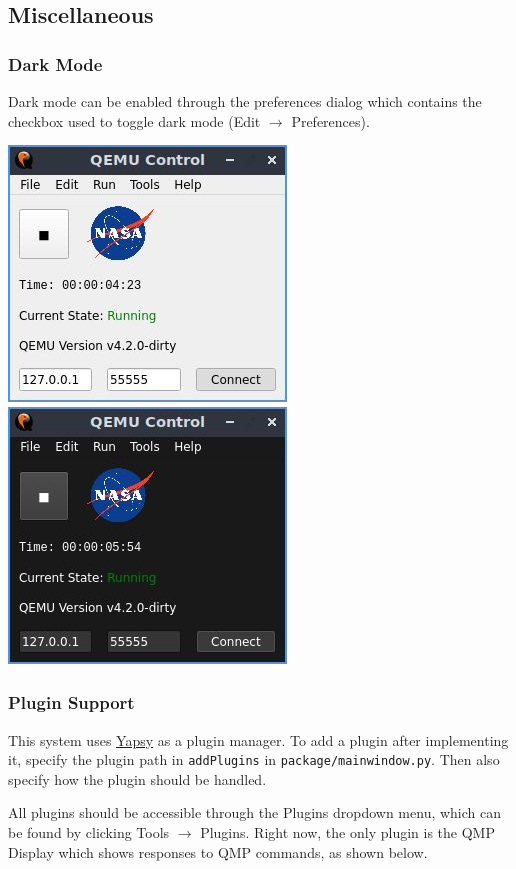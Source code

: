 \documentclass{article}
\newcommand{\code}[1]{\texttt{#1}}
\begin{document}
\subsection{Miscellaneous}
\subsubsection{Dark Mode}
Dark mode can be enabled through the preferences dialog which contains the checkbox used to toggle dark mode (Edit $\rightarrow$ Preferences).
\begin{center}
    \includegraphics[]{images/main_active.jpg}
    \includegraphics[]{images/main_active_dark.jpg}
\end{center}
\subsubsection{Plugin Support}
This system uses \href{https://yapsy.readthedocs.io/en/latest/}{Yapsy} as a plugin manager. To add a plugin after implementing it, specify the plugin path in \code{addPlugins} in \code{package/mainwindow.py}. Then also specify how the plugin should be handled.\par
All plugins should be accessible through the Plugins dropdown menu, which can be found by clicking Tools $\rightarrow$ Plugins. Right now, the only plugin is the QMP Display which shows responses to QMP commands, as shown below.
\end{document}
